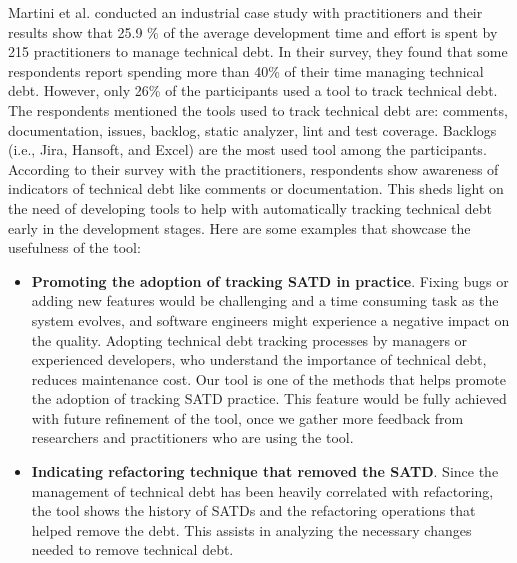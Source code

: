 \documentclass[3p]{elsarticle}
\begin{document}
Martini et al. \cite{martini2018technical} conducted an industrial case study with practitioners and their results show that 25.9 \% of the average development time and effort is spent by 215 practitioners to manage technical debt. In their survey, they found that  some respondents report spending more than 40\% of their time managing technical debt. However, only 26\% of the participants used a tool to track technical debt. The respondents mentioned the tools used to track technical debt are: comments, documentation, issues, backlog, static analyzer, lint and test coverage. Backlogs (i.e.,  Jira, Hansoft, and Excel) are the most used tool among the participants. According to their survey with the practitioners, respondents show awareness of indicators of technical debt like comments or documentation. This sheds light on the need of developing tools to help with automatically tracking technical debt early in the development stages. Here are some examples that showcase the usefulness of the tool:


\begin{itemize}
    \item \textbf{Promoting the adoption of tracking SATD in practice}. Fixing bugs or adding new features would be challenging and a time consuming task  as the system evolves, and software engineers might experience a negative impact on the quality. Adopting technical debt tracking processes by managers or experienced developers, who understand the importance of technical debt, reduces maintenance cost. Our tool is one of the methods that helps promote the adoption of tracking SATD practice. This feature would be fully achieved with future refinement of the tool, once we gather more feedback from researchers and practitioners who are using the tool.
    \item \textbf{Indicating refactoring technique that removed the SATD}. Since the management of technical debt has been heavily correlated with refactoring, the tool shows the history of SATDs and the refactoring operations that helped remove the debt. This assists in analyzing the necessary changes needed to remove technical debt.
\end{itemize}
\end{document}
